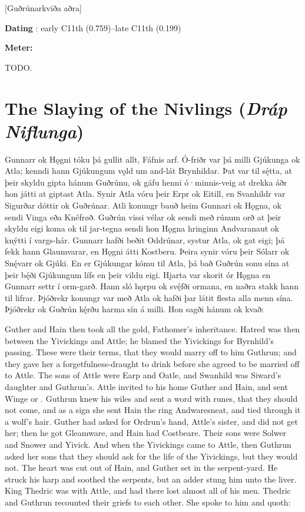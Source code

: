 [Guðrúnarkviða aðra]

\begin{flushright}%
\textbf{Dating} \parencite{Sapp2022}: early C11th (0.759)–late C11th (0.199)

\textbf{Meter:} \Fornyrdislag%
\end{flushright}

TODO.

\sectionline

\section{The Slaying of the Nivlings (\emph{Dráp Niflunga})}

\bpg\bpa Gunnarr ok Hǫgni tóku þá gullit allt, Fáfnis arf. Ó-friðr var þá milli Gjúkunga ok Atla; kenndi hann Gjúkungum vǫld um and-lát Brynhildar. Þat var til sę́tta, at þeir skyldu gipta hánum Guðrúnu, ok gáfu henni ó·minnis-veig at drekka áðr hon játti at giptast Atla. Synir Atla vóru þeir Erpr ok Eitill, en Svanhildr var Sigurðar dóttir ok Guðrúnar. Atli konungr bauð heim Gunnari ok Hǫgna, ok sendi Vinga eða Knéfrøð. Guðrún vissi vélar ok sendi með rúnum orð at þeir skyldu eigi koma ok til jar-tegna sendi hon Hǫgna hringinn Andvaranaut ok knýtti í vargs-hár. Gunnarr hafði beðit Oddrúnar, systur Atla, ok gat eigi; þá fekk hann Glaumvarar, en Hǫgni átti Kostberu. Þeira synir vóru þeir Sólarr ok Snę́varr ok Gjúki. En er Gjúkungar kómu til Atla, þá bað Guðrún sonu sína at þeir bę́ði Gjúkungum lífs en þeir vildu eigi. Hjarta var skorit ór Hǫgna en Gunnarr settr í orm-garð. Hann sló hǫrpu ok svę́fði ormana, en naðra stakk hann til lifrar. Þjóðrekr konungr var með Atla ok hafði þar látit flesta alla menn sína. Þjóðrekr ok Guðrún kę́rðu harma sín á milli. Hon sagði hánum ok kvað:\epa

\bpb Guther and Hain then took all the gold, Fathomer’s inheritance.  Hatred was then between the Yivickings and Attle; he blamed the Yivickings for Byrnhild’s passing.  These were their terms, that they would marry off to him Guthrun; and they gave her a forgetfulness-draught to drink before she agreed to be married off to Attle. The sons of Attle were Earp and Oatle, and Swanhild was Siward’s daughter and Guthrun’s. Attle invited to his home Guther and Hain, and sent Winge or . Guthrun knew his wiles and sent a word with runes, that they should not come, and as a sign she sent Hain the ring Andwaresneat, and tied through it a wolf’s hair. Guther had asked for Ordrun’s hand, Attle’s sister, and did not get her; then he got Gleamware, and Hain had Costbeare. Their sons were Solwer and Snower and Yivick. And when the Yivickings came to Attle, then Guthrun asked her sons that they should ask for the life of the Yivickings, but they would not. The heart was cut out of Hain, and Guther set in the serpent-yard. He struck his harp and soothed the serpents, but an adder stung him unto the liver. King Thedric was with Attle, and had there lost almost all of his men. Thedric and Guthrun recounted their griefs to each other. She spoke to him and quoth:\epb\epg

